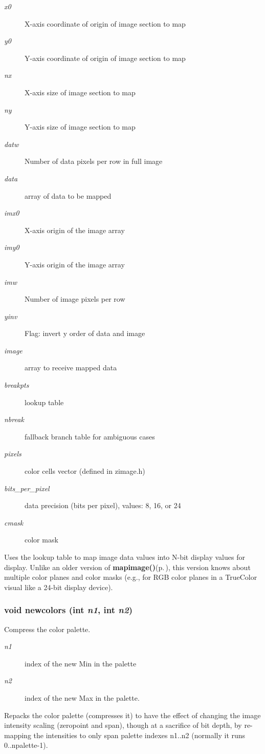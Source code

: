 \begin{Desc}
\item[Parameters:]
\begin{description}
\item[{\em x0}]X-axis coordinate of origin of image section to map \item[{\em y0}]Y-axis coordinate of origin of image section to map \item[{\em nx}]X-axis size of image section to map \item[{\em ny}]Y-axis size of image section to map \item[{\em datw}]Number of data pixels per row in full image \item[{\em data}]array of data to be mapped \item[{\em imx0}]X-axis origin of the image array \item[{\em imy0}]Y-axis origin of the image array \item[{\em imw}]Number of image pixels per row \item[{\em yinv}]Flag: invert y order of data and image \item[{\em image}]array to receive mapped data \item[{\em breakpts}]lookup table \item[{\em nbreak}]fallback branch table for ambiguous cases \item[{\em pixels}]color cells vector (defined in zimage.h) \item[{\em bits\_\-per\_\-pixel}]data precision (bits per pixel), values: 8, 16, or 24 \item[{\em cmask}]color mask\end{description}
\end{Desc}
Uses the lookup table to map image data values into N-bit display values for display. Unlike an older version of {\bf mapimage()}{\rm (p.\,\pageref{xtv_8h_a119})}, this version knows about multiple color planes and color masks (e.g., for RGB color planes in a True\-Color visual like a 24-bit display device). 
\subsubsection{\setlength{\rightskip}{0pt plus 5cm}void newcolors (int {\em n1}, int {\em n2})}\label{xtv_8h_a95}


Compress the color palette. 

\begin{Desc}
\item[Parameters:]
\begin{description}
\item[{\em n1}]index of the new Min in the palette \item[{\em n2}]index of the new Max in the palette.\end{description}
\end{Desc}
Repacks the color palette (compresses it) to have the effect of changing the image intensity scaling (zeropoint and span), though at a sacrifice of bit depth, by re-mapping the intensities to only span palette indexes n1..n2 (normally it runs 0..npalette-1). 
